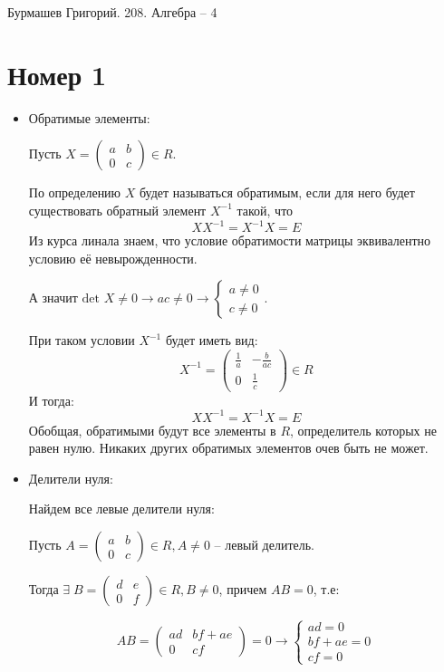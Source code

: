 \documentclass[a4paper,12pt]{article}
\author{Бурмашев Григорий, БПМИ-208}
\title{}
\date{\today}
\begin{document}
\begin{center}
Бурмашев Григорий. 208. Алгебра -- 4
\end{center}
\section*{Номер 1}
\begin{itemize}
\item Обратимые элементы:

\begin{center}
Пусть $ X= \begin{pmatrix}
a & b \\ 0 & c
\end{pmatrix}\in R$. 
\end{center}

По определению $X$ будет называться обратимым, если для него будет существовать обратный элемент $X^{-1}$ такой, что $$XX^{-1} = X^{-1}X = E$$
 Из курса линала знаем, что условие обратимости матрицы эквивалентно условию её невырожденности. 

А значит $\text{det } X \neq 0 \rightarrow ac \neq 0 \rightarrow \begin{cases}
a \neq 0 \\ c \neq 0 
\end{cases}$. 

При таком условии $X^{-1}$ будет иметь вид:
\[
X^{-1} = 
\begin{pmatrix}
\frac{1}{a} & -\frac{b}{ac} \\ 0 & \frac{1}{c}
\end{pmatrix} \in R
\]
И тогда:
\[
XX^{-1}= X^{-1}X = E
\]
Обобщая, обратимыми будут все элементы в $R$, определитель которых не равен нулю. Никаких других обратимых элементов очев быть не может.
\clearpage
\item Делители нуля:

\begin{center}
Найдем все левые делители нуля:
\end{center}

\begin{center}
 Пусть $A = \begin{pmatrix}
a & b \\ 0 & c 
\end{pmatrix} \in R, A \neq 0$ -- левый делитель. 

Тогда $\exists \;B = \begin{pmatrix}
d & e \\ 0 & f
\end{pmatrix} \in R, B \neq 0$, причем $AB = 0$, т.е:
\end{center}
\[
AB = \begin{pmatrix}
ad & bf + ae \\ 0 & cf
\end{pmatrix} = 0 \rightarrow \begin{cases}
ad = 0 \\ bf + ae = 0 \\ cf = 0
\end{cases}
\]


\end{itemize}
\end{document}
